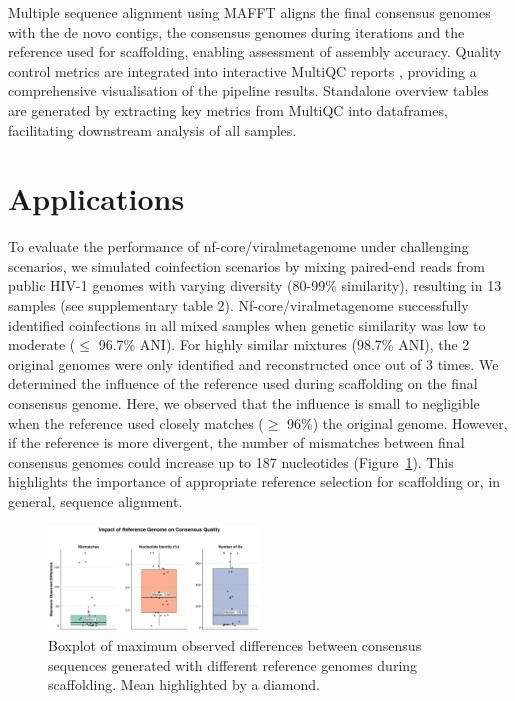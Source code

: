 Multiple sequence alignment using MAFFT \cite{Katoh2002-ox} aligns the final consensus genomes with the de novo contigs, the consensus genomes during iterations and the reference used for scaffolding, enabling assessment of assembly accuracy. Quality control metrics are integrated into interactive MultiQC reports \cite{Ewels2016-hs}, providing a comprehensive visualisation of the pipeline results. Standalone overview tables are generated by extracting key metrics from MultiQC into dataframes, facilitating downstream analysis of all samples.

\section{Applications}

To evaluate the performance of nf-core/viralmetagenome under challenging scenarios, we simulated coinfection scenarios by mixing paired-end reads from public HIV-1 genomes with varying diversity (80-99\% similarity), resulting in 13 samples (see supplementary table 2). Nf-core/viralmetagenome successfully identified coinfections in all mixed samples when genetic similarity was low to moderate ($\leq$ 96.7\% ANI). For highly similar mixtures (98.7\% ANI), the 2 original genomes were only identified and reconstructed once out of 3 times.
We determined the influence of the reference used during scaffolding on the final consensus genome. Here, we observed that the influence is small to negligible when the reference used closely matches ($\geq$ 96\%) the original genome. However, if the reference is more divergent, the number of mismatches between final consensus genomes could increase up to 187 nucleotides (Figure~\ref{fig:reference-influence}). This highlights the importance of appropriate reference selection for scaffolding or, in general, sequence alignment.

\begin{figure}[htbp]
    \centering
    \includegraphics[width=0.5\textwidth]{Fig/fig2.png}
    \caption{Boxplot of maximum observed differences between consensus sequences generated with different reference genomes during scaffolding. Mean highlighted by a diamond.}
    \label{fig:reference-influence}
\end{figure}

